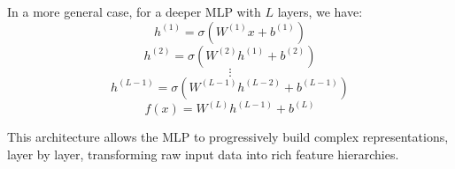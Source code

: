 \documentclass{article}
\theoremstyle{definition}
\theoremstyle{remark}
\begin{document}
In a more general case, for a deeper MLP with \(L\) layers, we have:
\[
h^{(1)} = \sigma(W^{(1)} x + b^{(1)})
\]
\[
h^{(2)} = \sigma(W^{(2)} h^{(1)} + b^{(2)})
\]
\[
\vdots
\]
\[
h^{(L-1)} = \sigma(W^{(L-1)} h^{(L-2)} + b^{(L-1)})
\]
\[
f(x) = W^{(L)} h^{(L-1)} + b^{(L)}
\]

This architecture allows the MLP to progressively build complex representations, layer by layer, transforming raw input data into rich feature hierarchies.
\end{document}
